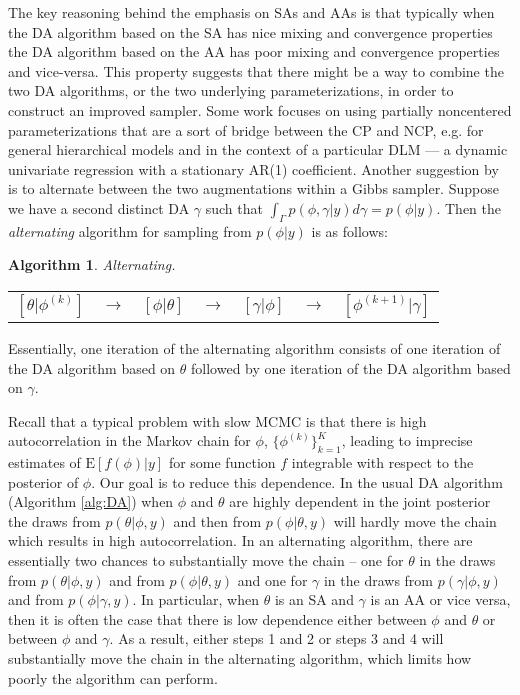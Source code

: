 \documentclass{article}
\newtheorem{alg}{Algorithm}
\begin{document}
The key reasoning behind the emphasis on SAs and AAs is that typically when the DA algorithm based on the SA has nice mixing and convergence properties the DA algorithm based on the AA has poor mixing and convergence properties and vice-versa. This property suggests that there might be a way to combine the two DA algorithms, or the two underlying parameterizations, in order to construct an improved sampler. Some work focuses on using partially noncentered parameterizations that are a sort of bridge between the CP and NCP, e.g.  for general hierarchical models and  in the context of a particular DLM --- a dynamic univariate regression with a stationary AR(1) coefficient. Another suggestion by  is to alternate between the two augmentations within a Gibbs sampler. Suppose we have a second distinct DA $\gamma$ such that $\int_\Gamma p(\phi,\gamma|y)d\gamma = p(\phi|y)$. Then the {\it alternating} algorithm for sampling from $p(\phi|y)$ is as follows:
\begin{alg}Alternating.\label{alg:Alt} \\
  \begin{center}
    \begin{tabular}{lllllll}
  $[\theta|\phi^{(k)}]$& $\to$& $[\phi|\theta]$& $\to$& $[\gamma|\phi]$& $\to$& $[\phi^{(k+1)}|\gamma]$
    \end{tabular}
  \end{center}
\end{alg}
\noindent Essentially, one iteration of the alternating algorithm consists of one iteration of the DA algorithm based on $\theta$ followed by one iteration of the DA algorithm based on $\gamma$. 

Recall that a typical problem with slow MCMC is that there is high autocorrelation in the Markov chain for $\phi$, $\{\phi^{(k)}\}_{k=1}^K$, leading to imprecise estimates of $\mathrm{E}[f(\phi)|y]$ for some function $f$ integrable with respect to the posterior of $\phi$. Our goal is to reduce this dependence. In the usual DA algorithm (Algorithm \ref{alg:DA}) when $\phi$ and $\theta$ are highly dependent in the joint posterior the draws from $p(\theta|\phi,y)$ and then from $p(\phi|\theta,y)$ will hardly move the chain which results in high autocorrelation. In an alternating algorithm, there are essentially two chances to substantially move the chain -- one for $\theta$ in the draws from $p(\theta|\phi,y)$ and from $p(\phi|\theta,y)$ and one for $\gamma$ in the draws from $p(\gamma|\phi,y)$ and from $p(\phi|\gamma,y)$.  In particular, when $\theta$ is an SA and $\gamma$ is an AA or vice versa, then it is often the case that there is low dependence either between $\phi$ and $\theta$ or between $\phi$ and $\gamma$. As a result, either steps 1 and 2 or steps 3 and 4 will substantially move the chain in the alternating algorithm, which limits how poorly the algorithm can perform.
\end{document}
